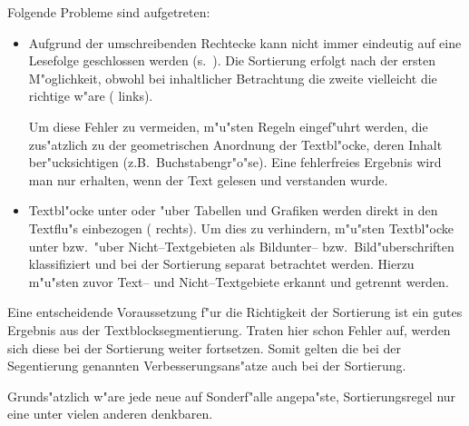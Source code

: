 
Folgende Probleme sind aufgetreten:
\begin{itemize}
  \item Aufgrund der umschreibenden Rechtecke kann nicht immer eindeutig auf eine Lesefolge
  geschlossen werden (s.\ ). Die Sortierung erfolgt nach der
  ersten M"oglichkeit, obwohl bei inhaltlicher Betrachtung die zweite
  vielleicht die richtige w"are ( links).
  
  
  Um diese Fehler zu vermeiden, m"u"sten Regeln eingef"uhrt werden, die zus"atzlich
  zu der geometrischen Anordnung der Textbl"ocke, deren Inhalt ber"ucksichtigen 
  (z.B.\ Buchstabengr"o"se). Eine fehlerfreies Ergebnis wird man nur erhalten, wenn der Text
  gelesen und verstanden wurde.

  \item Textbl"ocke unter oder "uber Tabellen und Grafiken 
  werden direkt in den Textflu"s einbezogen ( rechts). Um dies zu verhindern,
  m"u"sten Textbl"ocke unter bzw.\ "uber Nicht--Textgebieten als Bildunter-- 
  bzw.\ Bild"uberschriften
  klassifiziert und bei der Sortierung separat betrachtet werden. Hierzu m"u"sten zuvor
  Text-- und Nicht--Textgebiete erkannt und getrennt werden.
\end{itemize}


Eine entscheidende Voraussetzung f"ur die Richtigkeit der Sortierung ist ein gutes Ergebnis aus der
Textblocksegmentierung. Traten hier schon Fehler auf, werden sich diese
bei der Sortierung weiter fortsetzen. Somit gelten die bei der Segentierung genannten
Verbesserungsans"atze auch bei der Sortierung.

Grunds"atzlich w"are jede neue auf Sonderf"alle angepa"ste, Sortierungsregel nur eine unter
vielen anderen denkbaren. 


